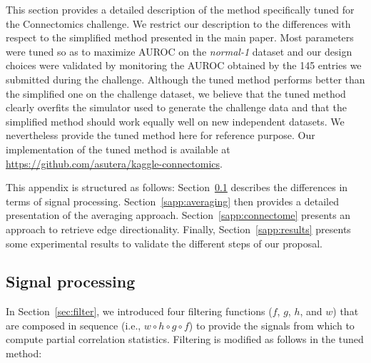 \documentclass[wcp]{jmlr}
\begin{document}
This section provides a detailed description of the method specifically tuned
for the Connectomics challenge. We restrict our description to the
differences with respect to the simplified method presented in the main
paper. Most parameters were tuned so as to maximize AUROC on the
\textit{normal-1} dataset and our design choices were validated by monitoring
the AUROC obtained by the 145 entries we submitted during the
challenge. Although the tuned method performs better than the simplified one on
the challenge dataset, we believe that the tuned method clearly overfits the
simulator used to generate the challenge data and that the simplified method
should work equally well on new independent datasets. We nevertheless provide
the tuned method here for reference purpose. Our implementation of the tuned
method is available at \url{https://github.com/asutera/kaggle-connectomics}.

This appendix is structured as follows: Section~\ref{sapp:signal} describes the
differences in terms of signal processing. Section~\ref{sapp:averaging} then
provides a detailed presentation of the averaging
approach. Section~\ref{sapp:connectome} presents an approach to retrieve edge
directionality. Finally, Section~\ref{sapp:results} presents some experimental
results to validate the different steps of our proposal.


\subsection{Signal processing}
\label{sapp:signal}

In Section~\ref{sec:filter}, we introduced four filtering functions ($f$, $g$,
$h$, and $w$) that are composed in sequence (i.e., $w \circ h \circ g \circ
f$) to provide the signals from which to compute partial correlation
statistics. Filtering is modified as follows in the tuned method:
\end{document}
